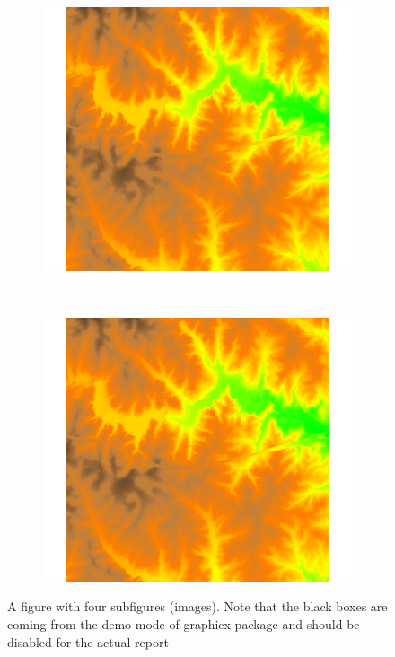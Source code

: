 \documentclass[10pt]{article}
\newcommand{\twobytwoimgwidth}{0.4\textwidth}
\begin{document}
\begin{figure}[htbp]
\begin{subfigure}[b]{\twobytwoimgwidth}
    \caption{}
  \end{subfigure}
  \\[0.01\textheight]
    \begin{subfigure}[b]{\twobytwoimgwidth}
    \includegraphics[width=\textwidth]{report_template_image}
    \caption{}
  \end{subfigure}
  ~
  \begin{subfigure}[b]{\twobytwoimgwidth}
    \includegraphics[width=\textwidth]{report_template_image}
    \caption{}
  \end{subfigure}%
  \caption{A figure with four subfigures (images).
    Note that the black boxes are coming from the demo mode of graphicx package
    and should be disabled for the actual report}
  \label{fig:afigure}
\end{figure}
\end{document}
